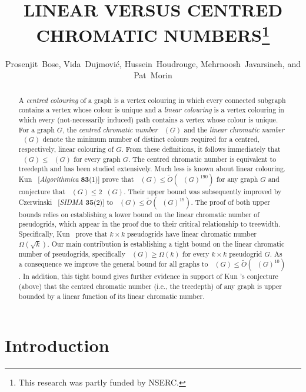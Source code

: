 \documentclass{patmorin}
\title{\MakeUppercase{Linear versus centred chromatic numbers}\thanks{This research was partly funded by NSERC.}}
\author{Prosenjit~Bose, Vida~Dujmović, Hussein~Houdrouge, Mehrnoosh~Javarsineh, and Pat~Morin}
\date{}
\DeclareMathOperator{\chicen}{\chi_{\mathrm{cen}}}
\DeclareMathOperator{\chilin}{\chi_{\mathrm{lin}}}
\begin{document}
\maketitle
\renewcommand{\E}{\mathbb{E}}
\renewcommand{\Pr}{\mathbb{P}}

\begin{abstract}
  A \emph{centred colouring} of a graph is a vertex colouring in which every connected subgraph contains a vertex whose colour is unique and a \emph{linear colouring} is a vertex colouring in which every (not-necessarily induced) path contains a vertex whose colour is unique.  For a graph $G$, the \emph{centred chromatic number} $\chicen(G)$ and the \emph{linear chromatic number} $\chilin(G)$ denote the minimum number of distinct colours required for a centred, respectively, linear colouring of $G$. From these definitions, it follows immediately that $\chilin(G)\le \chicen(G)$ for every graph $G$. The centred chromatic number is equivalent to treedepth and has been studied extensively. Much less is known about linear colouring.  Kun \etal\ [\textit{Algorithmica} \textbf{83}(1)] prove that $\chicen(G) \le \tilde{O}(\chilin(G)^{190})$ for any graph $G$ and conjecture that $\chicen(G)\le 2\chilin(G)$.  Their upper bound was subsequently improved by Czerwinski \etal\ [\textit{SIDMA} \textbf{35}(2)] to $\chicen(G)\le\tilde{O}(\chilin(G)^{19})$. The proof of both upper bounds relies on establishing a lower bound on the linear chromatic number of pseudogrids, which appear in the proof due to their critical relationship to treewidth.  Specifically, Kun \etal\ prove that $k\times k$ pseudogrids have linear chromatic number $\Omega(\sqrt{k})$. Our main contribution is establishing a tight bound on the linear chromatic number of pseudogrids, specifically $\chilin(G)\ge \Omega(k)$ for every $k\times k$ pseudogrid $G$. As a consequence we improve the general bound for all graphs to $\chicen(G)\le \tilde{O}(\chilin(G)^{10})$. In addition, this tight bound gives further evidence in support of Kun \etal's conjecture (above) that the centred chromatic number (i.e., the treedepth) of any graph is upper bounded by a linear function of its linear chromatic number.
\end{abstract}

\section{Introduction}
\end{document}
